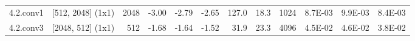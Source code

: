 \begin{table}
\begin{tabular}{llrrrrrrrrrr}
4.2.conv1 & [512, 2048] (1x1) & 2048 & {\cellcolor[HTML]{FFF8B4}} \color[HTML]{000000} -3.00 & {\cellcolor[HTML]{FFFAB6}} \color[HTML]{000000} -2.79 & {\cellcolor[HTML]{FFFBB8}} \color[HTML]{000000} -2.65 & 127.0 & 18.3 & 1024 & {\cellcolor[HTML]{B9E176}} \color[HTML]{000000} 8.7E-03 & {\cellcolor[HTML]{C1E57B}} \color[HTML]{000000} 9.9E-03 & {\cellcolor[HTML]{B7E075}} \color[HTML]{000000} 8.4E-03 \\
4.2.conv3 & [2048, 512] (1x1) & 512 & {\cellcolor[HTML]{FAFDB8}} \color[HTML]{000000} -1.68 & {\cellcolor[HTML]{FAFDB8}} \color[HTML]{000000} -1.64 & {\cellcolor[HTML]{F8FCB6}} \color[HTML]{000000} -1.52 & 31.9 & 23.3 & 4096 & {\cellcolor[HTML]{F99355}} \color[HTML]{000000} 4.5E-02 & {\cellcolor[HTML]{F88C51}} \color[HTML]{F1F1F1} 4.6E-02 & {\cellcolor[HTML]{FDC372}} \color[HTML]{000000} 3.8E-02 \\
\bottomrule
\end{tabular}
\end{table}
